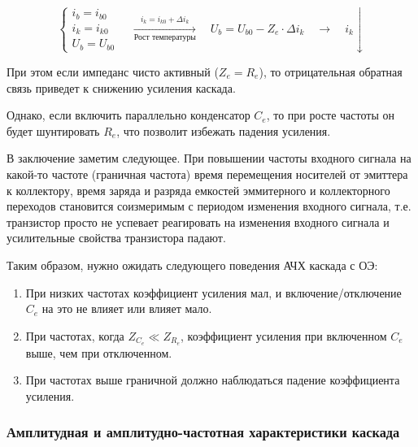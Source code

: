 \begin{equation*}
	\left\{
	\begin{aligned}
		i_b=i_{b0}\\
		i_k=i_{k0}\\
		U_b=U_{b0}
	\end{aligned}
	\right.\quad
	\xrightarrow[\text{Рост температуры}]{i_k=i_{k0}+\Delta i_k}\quad
	 U_b=U_{b0}-Z_e\cdot\Delta i_k\quad 
	 \longrightarrow\quad i_k \downarrow
\end{equation*}


При этом если импеданс чисто активный ($Z_e=R_e$), то отрицательная обратная связь приведет к снижению усиления каскада. 

Однако, если включить параллельно конденсатор $C_e$, то при росте частоты он будет шунтировать $R_e$, что позволит избежать падения усиления.

В заключение заметим следующее. При повышении частоты входного сигнала на какой-то частоте (граничная частота) время перемещения носителей от эмиттера к коллектору, время заряда и разряда емкостей эммитерного и коллекторного переходов становится соизмеримым с периодом изменения входного сигнала,  т.е. транзистор просто не успевает реагировать на изменения входного сигнала и усилительные свойства транзистора падают.

Таким образом, нужно ожидать следующего поведения АЧХ каскада с ОЭ: 
\begin{enumerate}
	\item При низких частотах коэффициент усиления мал, и включение/отключение $C_e$ на это не влияет или влияет мало.
	\item При частотах, когда $Z_{C_e}\ll Z_{R_e}$, коэффициент усиления при включенном $C_e$ выше, чем при отключенном.
	\item При частотах выше граничной должно наблюдаться падение коэффициента усиления.
\end{enumerate}

\subsubsection{Амплитудная и амплитудно-частотная характеристики каскада}

